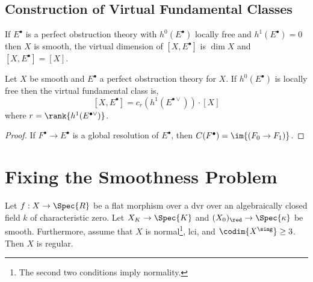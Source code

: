 \documentclass[12pt]{article}
\begin{document}
\subsection{Construction of Virtual Fundamental Classes}


\begin{prop}
If $E^\bullet$ is a perfect obstruction theory with $h^0(E^\bullet)$ locally free and $h^1(E^\bullet) = 0$ then $X$ is smooth, the virtual dimension of $[X, E^\bullet]$ is $\dim{X}$ and $[X, E^\bullet] = [X]$.
\end{prop}

\begin{prop}
Let $X$ be smooth and $E^\bullet$ a perfect obstruction theory for $X$. If $h^0(E^\bullet)$ is locally free then the virtual fundamental class is,
\[ [X, E^\bullet] = c_r(h^1(E^{\bullet \vee})) \cdot [X] \]
where $r = \rank{h^1(E^{\bullet \vee})}$.
\end{prop}

\begin{proof}
If $F^\bullet \to E^\bullet$ is a global resolution of $E^\bullet$, then $C(F^\bullet) = \im{(F_0 \to F_1)}$.
\end{proof}



\newpage

\section{Fixing the Smoothness Problem}


\begin{prop}
Let $f : X \to \Spec{R}$ be a flat morphism over a dvr over an algebraically closed field $k$ of characteristic zero. Let $X_K \to \Spec{K}$ and $(X_0)_{\red} \to \Spec{\kappa}$ be smooth. Furthermore, assume that $X$ is normal\footnote{The second two conditions imply normality.}, lci, and $\codim{X^{\sing}} \ge 3$. Then $X$ is regular.
\end{prop}
\end{document}
